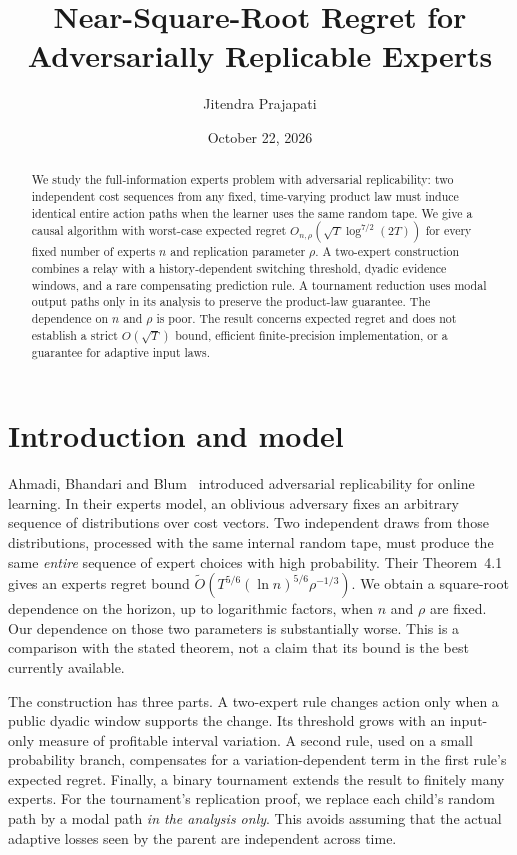 \documentclass[11pt]{article}
\title{Near-Square-Root Regret for Adversarially Replicable Experts}
\author{Jitendra Prajapati}
\date{October 22, 2026}
\theoremstyle{remark}\newtheorem{remark}[theorem]{Remark}
\begin{document}
\maketitle
\begin{abstract}
We study the full-information experts problem with adversarial replicability: two independent cost sequences from any fixed, time-varying product law must induce identical entire action paths when the learner uses the same random tape. We give a causal algorithm with worst-case expected regret $O_{n,\rho}(\sqrt T\log^{7/2}(2T))$ for every fixed number of experts $n$ and replication parameter $\rho$. A two-expert construction combines a relay with a history-dependent switching threshold, dyadic evidence windows, and a rare compensating prediction rule. A tournament reduction uses modal output paths only in its analysis to preserve the product-law guarantee. The dependence on $n$ and $\rho$ is poor. The result concerns expected regret and does not establish a strict $O(\sqrt T)$ bound, efficient finite-precision implementation, or a guarantee for adaptive input laws.
\end{abstract}
\section{Introduction and model}
Ahmadi, Bhandari and Blum~\cite{abb} introduced adversarial replicability
for online learning. In their experts model, an oblivious adversary fixes
an arbitrary sequence of distributions over cost vectors. Two independent
draws from those distributions, processed with the same internal random
tape, must produce the same \emph{entire} sequence of expert choices with
high probability. Their Theorem~4.1 gives an experts regret bound
$\widetilde O(T^{5/6}(\ln n)^{5/6}\rho^{-1/3})$.
We obtain a square-root dependence on the horizon, up to logarithmic
factors, when $n$ and $\rho$ are fixed. Our dependence on those two
parameters is substantially worse. This is a comparison with the stated
theorem, not a claim that its bound is the best currently available.

The construction has three parts. A two-expert rule changes action only
when a public dyadic window supports the change. Its threshold grows with
an input-only measure of profitable interval variation. A second rule,
used on a small probability branch, compensates for a variation-dependent
term in the first rule's expected regret. Finally, a binary tournament
extends the result to finitely many experts. For the tournament's
replication proof, we replace each child's random path by a modal path
\emph{in the analysis only}. This avoids assuming that the actual
adaptive losses seen by the parent are independent across time.
\end{document}
